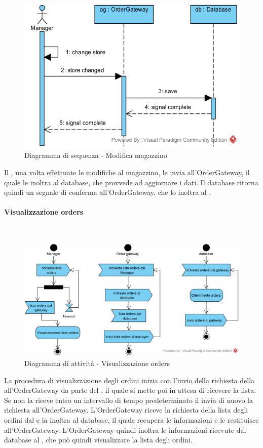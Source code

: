 \begin{figure}[H]
	\centering
	\includegraphics[width=14cm]{../../documenti/SpecificaTecnica/diagrammi_img/sequenza/direttore_modifica_magazzino.png}
	\caption{Diagramma di sequenza - Modifica magazzino}
\end{figure}
Il \Manager{}, una volta effettuate le modifiche al magazzino, le invia all'Order\-Gateway, il quale le inoltra al database, che provvede ad aggiornare i dati. Il database ritorna quindi un segnale di conferma all'Order\-Gateway, che lo inoltra al \Manager{}.


\paragraph{Visualizzazione orders}\mbox{}\\
\nopagebreak
\begin{figure}[H]
	\centering
	\includegraphics[width=14cm]{diagrammi_img/attivita/manager_ordini.png}
	\caption{Diagramma di attività - Visualizzazione orders}
\end{figure}
La procedura di visualizzazione degli ordini inizia con l'invio della richiesta della  all'OrderGateway da parte del \Manager{}, il quale si mette poi in attesa di ricevere la lista. Se non la riceve entro un intervallo di tempo predeterminato il \Manager{} invia di nuovo la richiesta all'OrderGateway. L'OrderGateway riceve la richiesta della lista degli ordini dal \Manager{} e la inoltra al database, il quale recupera le informazioni e le restituisce all'OrderGateway. L'OrderGateway quindi inoltra le informazioni ricevute dal database al \Manager{}, che può quindi visualizzare la lista degli ordini.

